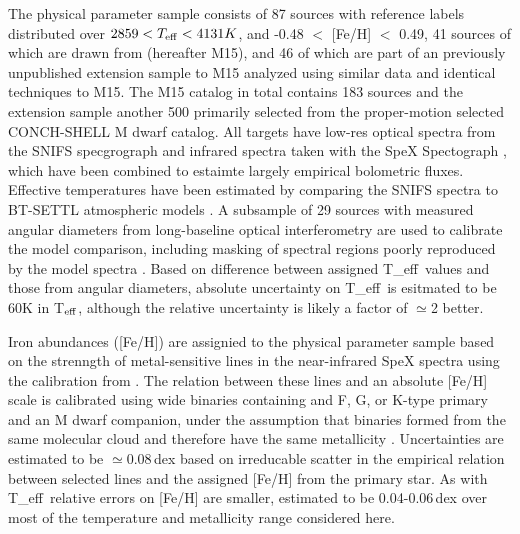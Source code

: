 \documentclass[modern]{aastex62}
\newcommand{\teff}{T_{\rm eff}}
\begin{document}
The physical parameter sample consists of 87 sources with reference labels distributed over $2859 < T_{\rm eff} < 4131K$, and -0.48 $<$ [Fe/H] $<$ 0.49, 41 sources of which are drawn from \citealt{Mann:2015} (hereafter M15), and 46 of which are part of an previously unpublished extension sample to M15 analyzed using similar data and identical techniques to M15. The M15 catalog in total contains 183 sources and the extension sample another 500 primarily selected from the proper-motion selected CONCH-SHELL \citep{Gaidos:2013} M dwarf catalog. All targets have low-res optical spectra from the SNIFS specgrograph \citep{Lantz:2004} and infrared spectra taken with the SpeX Spectograph \citep{Rayner:2003}, which have been combined to estaimte largely empirical bolometric fluxes. Effective temperatures have been estimated by comparing the SNIFS spectra to BT-SETTL atmospheric models \citep{Allard:2011}. A subsample of 29 sources with measured angular diameters from long-baseline optical interferometry \citep{Boyajian:2012} are used to calibrate the model comparison, including masking of spectral regions poorly reproduced by the model spectra \citep{Mann:2013c}. Based on difference between assigned \teff\ values and those from angular diameters, absolute uncertainty on \teff\ is esitmated to be 60K in T$_{\rm eff}$, although the relative uncertainty is likely a factor of $\simeq$2 better.

Iron abundances ([Fe/H]) are assignied to the physical parameter sample based on the strenngth of metal-sensitive lines in the near-infrared SpeX spectra \citep{RojasAyala:2010} using the calibration from \citet{Mann:2013a}. The relation between these lines and an absolute [Fe/H] scale is calibrated using wide binaries containing and F, G, or K-type primary and an M dwarf companion, under the assumption that binaries formed from the same molecular cloud and therefore have the same metallicity \citep{Bonfils:2005}. Uncertainties are estimated to be $\simeq$0.08\,dex based on irreducable scatter in the empirical relation between selected lines and the assigned [Fe/H] from the primary star. As with \teff\ relative errors on [Fe/H] are smaller, estimated to be 0.04-0.06\,dex over most of the temperature and metallicity range considered here.
\end{document}
